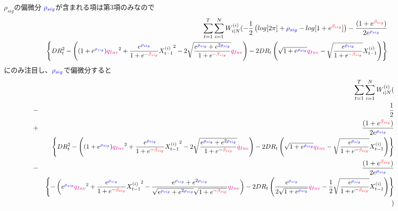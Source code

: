 \documentclass[a4j,11pt]{jarticle}
\makeatletter
\def\subsection{\@startsection{subsection}{1}{\z@}
   {0\Cvs \@plus.5\Cdp \@minus.2\Cdp}
   {0.01\Cvs \@plus.3\Cdp}
   {\normalfont \normalsize \bfseries}}
\makeatother
\begin{document}
\subsection{$\rho_{sig}$の偏微分}
$\textcolor{blue}{\rho_{sig}}$が含まれる項は第3項のみなので
\begin{eqnarray*}
&&\sum_{t=1}^{T}\sum_{i=1}^{N}W_{i|N}^{(i)}
(-\frac{1}{2} \left(log[2\pi] + \textcolor{blue}{\rho_{sig}} - log[1+e^{\textcolor{red}{\beta_{sig}}}]\right)
-\frac{(1+e^{\textcolor{red}{\beta_{sig}}})}{2e^{\textcolor{blue}{\rho_{sig}}}}\\
&&
\scalebox{0.95}{$\displaystyle
\left\{DR_t^2-
\left((1+ e^{\textcolor{blue}{\rho_{sig}}} ) \textcolor{magenta}{q_{Inv}}^2+\frac{e^{\textcolor{blue}{\rho_{sig}}}}{1+e^{-\textcolor{red}{\beta_{sig}}}}{X_{t-1}^{(i)}}^2 - 2 \sqrt{\frac{e^{\textcolor{blue}{\rho_{sig}}} + e^{2\textcolor{blue}{\rho_{sig}}} }{1+e^{-\textcolor{red}{\beta_{sig}}}} }\textcolor{magenta}{q_{Inv}}\right)
 - 2DR_t
\left(\sqrt{1+e^{\textcolor{blue}{\rho_{sig}}}} \textcolor{magenta}{q_{Inv}}-\sqrt{\frac{e^{\textcolor{blue}{\rho_{sig}}}}{1+e^{-\textcolor{red}{\beta_{sig}}}}}X_{t-1}^{(i)}\right)
 \right\}
$}
\end{eqnarray*}
にのみ注目し、$\textcolor{blue}{\rho_{sig}}$で偏微分すると
\begin{eqnarray}
&&\sum_{t=1}^{T}\sum_{i=1}^{N}W_{i|N}^{(i)}(\nonumber \\
&-&\frac{1}{2}\nonumber\\
&+&\frac{(1+e^{\textcolor{red}{\beta_{sig}}})}{2e^{\textcolor{blue}{\rho_{sig}}}}
\nonumber\\
&&
\scalebox{0.95}{$\displaystyle
\left\{DR_t^2-
\left((1+ e^{\textcolor{blue}{\rho_{sig}}} ) \textcolor{magenta}{q_{Inv}}^2+\frac{e^{\textcolor{blue}{\rho_{sig}}}}{1+e^{-\textcolor{red}{\beta_{sig}}}}{X_{t-1}^{(i)}}^2 - 2 \sqrt{\frac{e^{\textcolor{blue}{\rho_{sig}}} + e^{2\textcolor{blue}{\rho_{sig}}} }{1+e^{-\textcolor{red}{\beta_{sig}}}} }\textcolor{magenta}{q_{Inv}}\right)
 - 2DR_t
\left(\sqrt{1+e^{\textcolor{blue}{\rho_{sig}}}} \textcolor{magenta}{q_{Inv}}-\sqrt{\frac{e^{\textcolor{blue}{\rho_{sig}}}}{1+e^{-\textcolor{red}{\beta_{sig}}}}}X_{t-1}^{(i)}\right)
 \right\}
$}\nonumber\\
&-&\frac{(1+e^{\textcolor{red}{\beta_{sig}}})}{2e^{\textcolor{blue}{\rho_{sig}}}}\nonumber\\
&&
\scalebox{0.95}{$\displaystyle
\left\{-
\left( e^{\textcolor{blue}{\rho_{sig}}}  \textcolor{magenta}{q_{Inv}}^2+\frac{e^{\textcolor{blue}{\rho_{sig}}}}{1+e^{-\textcolor{red}{\beta_{sig}}}}{X_{t-1}^{(i)}}^2 -  \frac{ e^{\textcolor{blue}{\rho_{sig}}}+e^{2\textcolor{blue}{\rho_{sig}}} }{\sqrt{e^{\textcolor{blue}{\rho_{sig}}}+e^{2\textcolor{blue}{\rho_{sig}}}}\sqrt{1+e^{-\textcolor{red}{\beta_{sig}}}} }\textcolor{magenta}{q_{Inv}}\right)
 - 2DR_t
\left(\frac{e^{\textcolor{blue}{\rho_{sig}}}}{2\sqrt{1+e^{\textcolor{blue}{\rho_{sig}}}}} \textcolor{magenta}{q_{Inv}}-\frac{1}{2}\sqrt{\frac{e^{\textcolor{blue}{\rho_{sig}}}}{1+e^{-\textcolor{red}{\beta_{sig}}}}}X_{t-1}^{(i)}\right)
 \right\}
$}\nonumber\\
&&)
\end{eqnarray}
\end{document}
